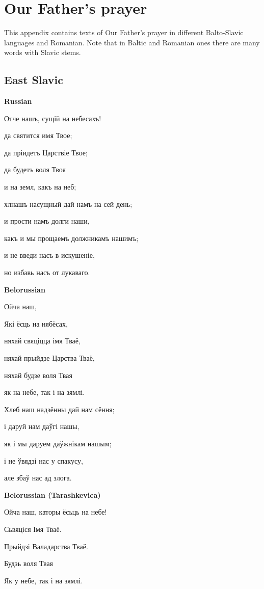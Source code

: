 \section{Our Father's prayer}

This appendix contains texts of Our Father's prayer in different Balto-Slavic languages and Romanian. Note that in Baltic and Romanian ones there are many words with Slavic stems.

\subsection{East Slavic}

\textbf{Russian}

Отче нашъ, сущій на небесахъ!

да святится имя Твое;

да пріидетъ Царствіе Твое;

да будетъ воля Твоя

и на земл\cyryat, какъ на неб\cyryat;

хл нашъ насущный дай намъ на сей день;

и прости намъ долги наши,

какъ и мы прощаемъ должникамъ нашимъ;

и не введи насъ в искушеніе,

но избавь насъ от лукаваго.

\textbf{Belorussian}

Ойча наш,

Які ёсць на нябёсах,

няхай свяціцца імя Тваё,

няхай прыйдзе Царства Тваё,

няхай будзе воля Твая

як на небе, так і на зямлі.

Хлеб наш надзённы дай нам сёння;

і даруй нам даўгі нашы,

як і мы даруем даўжнікам нашым;

і не ўвядзі нас у спакусу,

але збаў нас ад злога. 

\textbf{Belorussian (Tarashkevica)}

Ойча наш, каторы ёсьць на небе! 

Сьвяціся Імя Тваё. 

Прыйдзі Валадарства Тваё. 

Будзь воля Твая 

Як у небе, так і на зямлі. 

